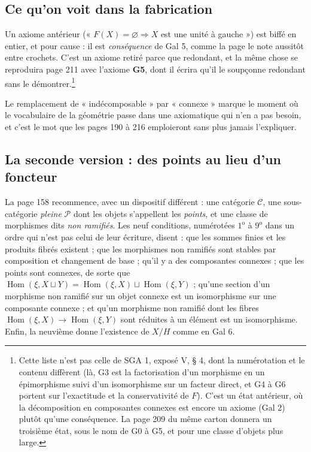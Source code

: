 \documentclass[11pt,a4paper]{article}
\begin{document}
\subsection*{Ce qu'on voit dans la fabrication}

Un axiome antérieur (« $F(X) = \varnothing \Rightarrow X$ est une unité à
gauche ») est biffé en entier, et pour cause : il est \emph{conséquence} de
Gal 5, comme la page le note aussitôt entre crochets. C'est un axiome retiré
parce que redondant, et la même chose se reproduira page 211 avec l'axiome
\textbf{G5}, dont il écrira qu'il le soupçonne redondant sans le
démontrer.\footnote{Cette liste n'est pas celle de SGA 1, exposé V, § 4, dont
la numérotation et le contenu diffèrent (là, G3 est la factorisation d'un
morphisme en un épimorphisme suivi d'un isomorphisme sur un facteur direct, et
G4 à G6 portent sur l'exactitude et la conservativité de $F$). C'est un état
antérieur, où la décomposition en composantes connexes est encore un axiome
(Gal 2) plutôt qu'une conséquence. La page 209 du même carton donnera un
troisième état, sous le nom de G0 à G5, et pour une classe d'objets plus large.}

Le remplacement de « indécomposable » par « connexe » marque le moment où le
vocabulaire de la géométrie passe dans une axiomatique qui n'en a pas besoin, et c'est le mot que les pages 190 à 216
emploieront sans plus jamais l'expliquer.

\subsection*{La seconde version : des points au lieu d'un foncteur}

La page 158 recommence, avec un dispositif différent : une catégorie
$\mathcal{C}$, une sous-catégorie \emph{pleine} $\mathcal{P}$ dont les objets
s'appellent les \emph{points}, et une classe de morphismes dits \emph{non
ramifiés}. Les neuf conditions, numérotées $1^{\mathrm{o}}$ à
$9^{\mathrm{o}}$ dans un ordre qui n'est pas celui de leur écriture, disent :
que les sommes finies et les produits fibrés existent ; que les morphismes non
ramifiés sont stables par composition et changement de base ; qu'il y a des
composantes connexes ; que les points sont connexes, de sorte que
$\operatorname{Hom}(\xi, X \sqcup Y) = \operatorname{Hom}(\xi, X) \sqcup
\operatorname{Hom}(\xi, Y)$ ; qu'une section d'un morphisme non ramifié sur un
objet connexe est un isomorphisme sur une composante connexe ; et qu'un
morphisme non ramifié dont les fibres $\operatorname{Hom}(\xi, X) \to
\operatorname{Hom}(\xi, Y)$ sont réduites à un élément est un isomorphisme.
Enfin, la neuvième donne l'existence de $X/H$ comme en Gal 6.
\end{document}
